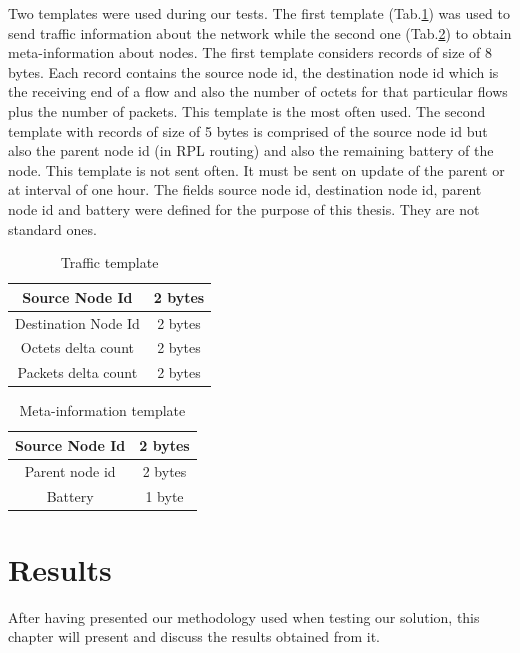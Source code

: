 Two templates were used during our tests. The first template (Tab.\ref{table:traffic_template}) was used to send traffic information about the network while the second one (Tab.\ref{table:meta_info_template}) to obtain meta-information about nodes. The first template considers records of size of 8 bytes. Each record contains the source node id, the destination node id which is the receiving end of a flow and also the number of octets for that particular flows plus the number of packets. This template is the most often used. The second template with records of size of 5 bytes is comprised of the source node id but also the parent node id (in RPL routing) and also the remaining battery of the node. This template is not sent often. It must be sent on update of the parent or at interval of one hour. The fields source node id, destination node id, parent node id and battery were defined for the purpose of this thesis. They are not standard ones.

\begin{table}
  \centering
  \begin{tabular}{|c|c|}
    \hline
    Source Node Id & 2 bytes \\
    \hline
    Destination Node Id & 2 bytes \\
    \hline
    Octets delta count & 2 bytes \\
    \hline
    Packets delta count & 2 bytes \\
    \hline
  \end{tabular}
  \caption{Traffic template}
  \label{table:traffic_template}
\end{table}

\begin{table}
  \centering
  \begin{tabular}{|c|c|}
    \hline
    Source Node Id & 2 bytes \\
    \hline
    Parent node id & 2 bytes \\
    \hline
    Battery & 1 byte \\
    \hline
  \end{tabular}
  \caption{Meta-information template}
  \label{table:meta_info_template}
\end{table}

\chapter{Results}

After having presented our methodology used when testing our solution, this chapter will present and discuss the results obtained from it.

